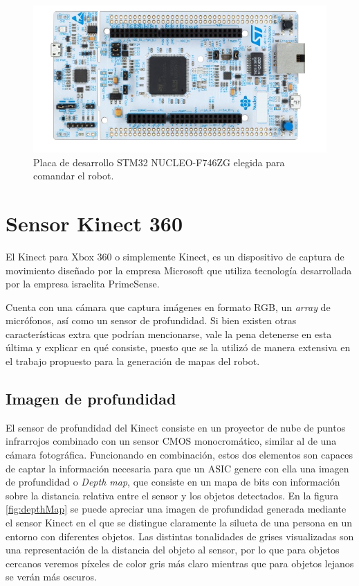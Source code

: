 \begin{figure}[ht]
    \centering
    \includegraphics[scale=1.3]{./Figures/stm32nucleo.png}
    \caption{Placa de desarrollo STM32 NUCLEO-F746ZG elegida para comandar el robot.\protect\footnotemark}
    \label{fig:stm32nucleo}
\end{figure}


\section{Sensor Kinect 360}

El Kinect para Xbox 360 o simplemente Kinect, es un dispositivo de captura de movimiento diseñado por la empresa Microsoft que utiliza tecnología desarrollada por la empresa israelita PrimeSense.

Cuenta con una cámara que captura imágenes en formato RGB, un \textit{array} de micrófonos, así como un sensor de profundidad. Si bien existen otras características extra que podrían mencionarse, vale la pena detenerse en esta última y explicar en qué consiste, puesto que se la utilizó de manera extensiva en el trabajo propuesto para la generación de mapas del robot.

\subsection{Imagen de profundidad}

El sensor de profundidad del Kinect consiste en un proyector de nube de puntos infrarrojos combinado con un sensor CMOS monocromático, similar al de una cámara fotográfica. Funcionando en combinación, estos dos elementos son capaces de captar la información necesaria para que un ASIC genere con ella una imagen de profundidad o \textit{Depth map}, que consiste en un mapa de bits con información sobre la distancia relativa entre el sensor y los objetos detectados. En la figura \ref{fig:depthMap} se puede apreciar una imagen de profundidad generada mediante el sensor Kinect en el que se distingue claramente la silueta de una persona en un entorno con diferentes objetos. Las distintas tonalidades de grises visualizadas son una representación de la distancia del objeto al sensor, por lo que para objetos cercanos veremos píxeles de color gris más claro mientras que para objetos lejanos se verán más oscuros.

